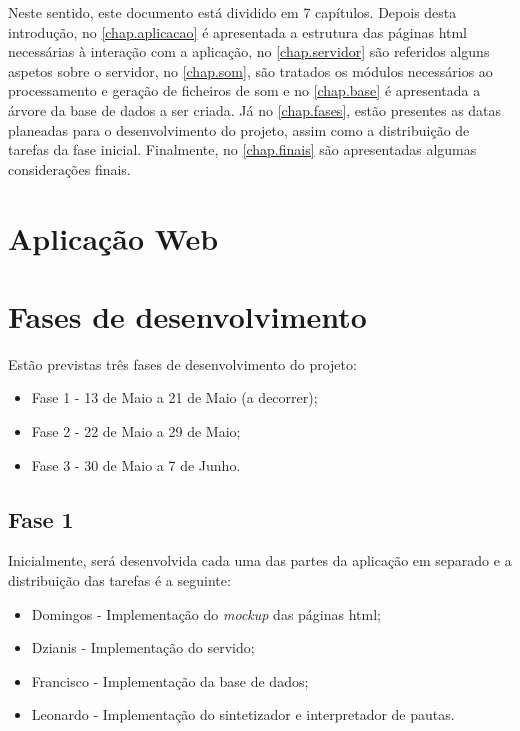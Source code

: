 \documentclass{report}
\begin{document}
Neste sentido, este documento está dividido em 7 capítulos. Depois desta introdução, no \autoref{chap.aplicacao} é apresentada a estrutura das páginas \ac{html} necessárias à interação com a aplicação, no \autoref{chap.servidor} são referidos alguns aspetos sobre o servidor, no \autoref{chap.som}, são tratados os módulos necessários ao processamento e geração de ficheiros de som e no \autoref{chap.base} é apresentada a árvore da base de dados a ser criada. Já no \autoref{chap.fases}, estão presentes as datas planeadas para o desenvolvimento do projeto, assim como a distribuição de tarefas da fase inicial. Finalmente, no \autoref{chap.finais} são apresentadas algumas considerações finais.

\chapter{Aplicação Web}
\label{chap.aplicacao}













\chapter{Fases de desenvolvimento}
\label{chap.fases}
Estão previstas três fases de desenvolvimento do projeto:

\begin{itemize}
\item Fase 1 - 13 de Maio a 21 de Maio (a decorrer);
\item Fase 2 - 22 de Maio a 29 de Maio;
\item Fase 3 - 30 de Maio a 7 de Junho.
\end{itemize}

\section{Fase 1}
Inicialmente, será desenvolvida cada uma das partes da aplicação em separado e a distribuição das tarefas é a seguinte:
\begin{itemize}
\item Domingos - Implementação do \textit{mockup} das páginas \ac{html};
\item Dzianis - Implementação do servido;
\item Francisco - Implementação da base de dados;
\item Leonardo - Implementação do sintetizador e interpretador de pautas.
\end{itemize}
\end{document}

